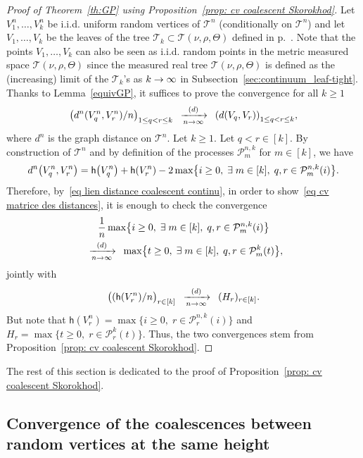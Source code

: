\documentclass[10pt]{amsart}
\theoremstyle{definition}\newtheorem{defi}[theo]{Definition}\newtheorem{rema}[theo]{Remark}\newtheorem{exam}[theo]{Example}\newtheorem{exem}[theo]{Example}\newtheorem{nota}[theo]{Notation}
\newcommand{\cvloi}[1][n]{\enskip\xrightarrow[#1 \to \infty]{(d)}\enskip}
\newcommand{\1}{\mathbbm{1}}
\newcommand{\Part}{\mathcal{P}}
\newcommand{\T}{\mathcal{T}}
\newcommand{\h}{\mathsf{h}}
\let\originalleft\left
\let\originalright\right
\renewcommand{\left}{\mathopen{}\mathclose\bgroup\originalleft}
\renewcommand{\right}{\aftergroup\egroup\originalright}
\renewcommand*{\to}{\mathchoice{\longrightarrow}{\rightarrow}{\rightarrow}{\rightarrow}}
\let\oldexists\exists
\renewcommand*{\exists}{\mathrel{\oldexists}}
\begin{document}
\begin{proof}[Proof of Theorem~\ref{th:GP} using Proposition~\ref{prop: cv coalescent Skorokhod}]
Let $V^n_1, \dots, V^n_k$ be i.i.d. uniform random vertices of $\T^n$ (conditionally on $\T^n$) and let $V_1, \dots, V_k$ be the leaves of the tree $\T_k\subset \T(\nu, \rho,\Theta)$ defined in p.~\pageref{th:GHP}. Note that the points $V_1,\dots, V_k$ can also be seen as i.i.d. random points in the metric measured space $\T(\nu, \rho,\Theta)$ since the measured real tree $\T(\nu, \rho,\Theta)$ is defined as the (increasing) limit of the $\T_k$'s as $k\to \infty$ in Subsection~\ref{sec:continuum_leaf-tight}. Thanks to Lemma~\ref{equivGP}, it suffices to prove the convergence for all $k\ge 1$
\begin{equation}\label{eq cv matrice des distances}
\left(d^n(V^n_q,V^n_r)/n \right)_{1 \le q < r \le k}
\cvloi[n]
\left(d(V_q,V_r) \right)_{1 \le q < r \le k},
\end{equation}
where $d^n$ is the graph distance on $\T^n$. Let $k\ge 1$. Let $q<r \in [k]$. By construction of $\T^n$ and by definition of the processes $\Part^{n,k}_m$ for $m \in [k]$, we have
\[
{d}^n\left(V^n_q,V^n_r\right) = \h\left(V^n_q\right) +\h\left(V^n_r\right)-2 \max \left\{i \ge 0, \; \exists m \in [k], \; q,r \in \Part^{n,k}_m(i) \right\}.
\]
Therefore, by~\eqref{eq lien distance coalescent continu}, in order to show~\eqref{eq cv matrice des distances}, it is enough to check the convergence
\begin{multline*}
\frac{1}{n}\max \left\{i \ge 0, \; \exists m \in [k], \; q,r \in \Part^{n,k}_m(i) \right\}\\
\cvloi[n]
\max \left\{ t \ge 0, \; \exists m \in [k], \; q, r \in \Part_m^k(t) \right\},
\end{multline*}
jointly with
\begin{equation}\label{eq cv hauteurs unif}
\bigl((\h(V^n_r)/n\bigr)_{r \in [k]} \cvloi[n] (H_r)_{r \in [k]}.
\end{equation}
But note that $\h(V^n_r) = \max \{ i\ge 0, \; r \in \Part_r^{n,k}(i) \}$ and $H_r = \max\{t \ge 0, \; r \in \Part^k_r(t)\}$. Thus, the two convergences stem from Proposition~\ref{prop: cv coalescent Skorokhod}.
\end{proof}

The rest of this section is dedicated to the proof of Proposition~\ref{prop: cv coalescent Skorokhod}.

\subsection{Convergence of the coalescences between random vertices at the same height}
\end{document}
